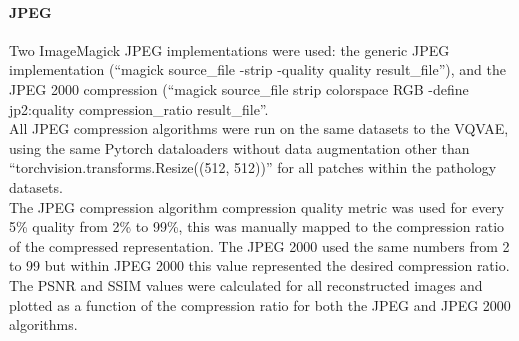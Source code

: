 \documentclass[review]{elsarticle}
\begin{document}



    
\paragraph{JPEG} Two ImageMagick JPEG implementations were used: the generic JPEG implementation (``magick {source\_file} -strip -quality {quality} {result\_file}''),
 and the JPEG 2000 compression (``magick {source\_file} \-strip \-colorspace RGB -define jp2:quality {compression\_ratio} {result\_file}''. \\
 All JPEG compression algorithms were run on the same datasets to the VQVAE, using the same Pytorch dataloaders without data augmentation other than “torchvision.transforms.Resize((512, 512))” for all patches within the pathology datasets. \\
 The JPEG compression algorithm compression quality metric was used for every 5\% quality from 2\% to 99\%, this was manually mapped to the compression ratio of the compressed representation. The JPEG 2000 used the same numbers from 2 to 99 but within JPEG 2000 this value represented the desired compression ratio. The PSNR and SSIM values were calculated for all reconstructed images and plotted as a function of the compression ratio for both the JPEG and JPEG 2000 algorithms.
\end{document}
